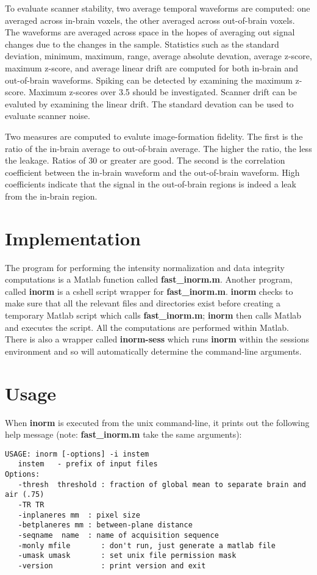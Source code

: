 \documentclass[10pt]{article}
\begin{document}
To evaluate scanner stability, two average temporal waveforms are
computed: one averaged across in-brain voxels, the other averaged
across out-of-brain voxels.  The waveforms are averaged across space
in the hopes of averaging out signal changes due to the changes in the
sample. Statistics such as the standard deviation, minimum, maximum,
range, average absolute devation, average z-score, maximum z-score,
and average linear drift are computed for both in-brain and
out-of-brain waveforms. Spiking can be detected by examining the
maximum z-score.  Maximum z-scores over 3.5 should be investigated.
Scanner drift can be evaluted by examining the linear drift. The
standard devation can be used to evaluate scanner noise.

Two measures are computed to evalute image-formation fidelity.  The
first is the ratio of the in-brain average to out-of-brain
average. The higher the ratio, the less the leakage. Ratios of 30 or
greater are good.  The second is the correlation coefficient between
the in-brain waveform and the out-of-brain waveform.  High
coefficients indicate that the signal in the out-of-brain regions is
indeed a leak from the in-brain region.

\section{Implementation}

The program for performing the intensity normalization and data
integrity computations is a Matlab function called {\bf
fast\_inorm.m}.  Another program, called {\bf inorm} is a cshell script
wrapper for {\bf fast\_inorm.m}. {\bf inorm} checks to make sure that
all the relevant files and directories exist before creating a
temporary Matlab script which calls {\bf fast\_inorm.m}; {\bf inorm}
then calls Matlab and executes the script. All the computations are
performed within Matlab.  There is also a wrapper called {\bf
inorm-sess} which runs {\bf inorm} within the sessions environment and
so will automatically determine the command-line arguments.

\section{Usage}

When {\bf inorm} is executed from the unix command-line, it prints out
the following help message (note: {\bf fast\_inorm.m} take the same
arguments): 
\begin{small}
\begin{verbatim}
USAGE: inorm [-options] -i instem
   instem   - prefix of input files
Options:
   -thresh  threshold : fraction of global mean to separate brain and air (.75)
   -TR TR
   -inplaneres mm  : pixel size
   -betplaneres mm : between-plane distance
   -seqname  name  : name of acquisition sequence
   -monly mfile       : don't run, just generate a matlab file
   -umask umask       : set unix file permission mask
   -version           : print version and exit
\end{verbatim}
\end{small}
\end{document}
